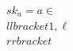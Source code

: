 \documentclass[preview]{standalone}
\begin{document}
\begin{align*}
sk_a = a \in \\llbracket 1, \ell \\rrbracket
\end{align*}
\end{document}
